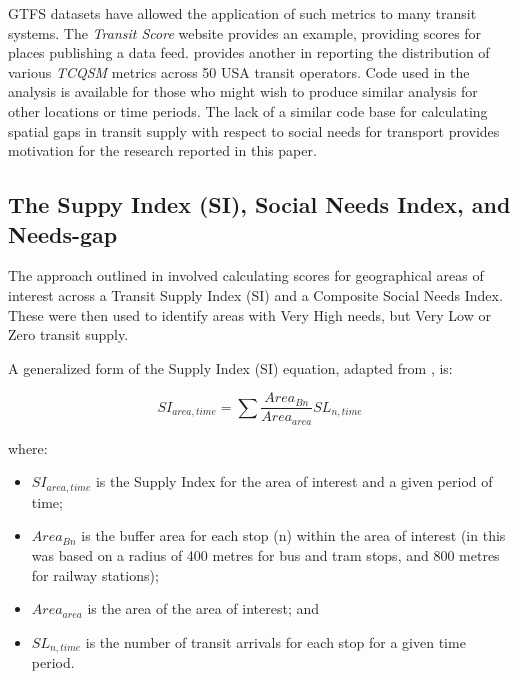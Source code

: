 \documentclass[preprint, 3p,
authoryear]{elsarticle} %
\begin{document}
GTFS datasets have allowed the application of such metrics to many
transit systems. The \emph{Transit Score} website provides an example,
providing scores for places publishing a data feed. \citet{Wong:2013aa}
provides another in reporting the distribution of various \emph{TCQSM}
metrics across 50 USA transit operators. Code used in the
\citet{Wong:2013aa} analysis is available for those who might wish to
produce similar analysis for other locations or time periods. The lack
of a similar code base for calculating spatial gaps in transit supply
with respect to social needs for transport provides motivation for the
research reported in this paper.

\subsection{The Suppy Index (SI), Social Needs Index, and
Needs-gap}\label{the-suppy-index-si-social-needs-index-and-needs-gap}

The approach outlined in \citet{currie2010identifying} involved
calculating scores for geographical areas of interest across a Transit
Supply Index (SI) and a Composite Social Needs Index. These were then
used to identify areas with Very High needs, but Very Low or Zero
transit supply.

A generalized form of the Supply Index (SI) equation, adapted from
\citet{currie2010identifying}, is:

\[SI_{area, time} = \sum{\frac{Area_{Bn}}{Area_{area}}SL_{n, time}}\]

where:

\begin{itemize}
\item
  \(SI_{area, time}\) is the Supply Index for the area of interest and a
  given period of time;
\item
  \(Area_{Bn}\) is the buffer area for each stop (n) within the area of
  interest (in \citet{currie2010identifying} this was based on a radius
  of 400 metres for bus and tram stops, and 800 metres for railway
  stations);
\item
  \(Area_{area}\) is the area of the area of interest; and
\item
  \(SL_{n,time}\) is the number of transit arrivals for each stop for a
  given time period.
\end{itemize}
\end{document}
